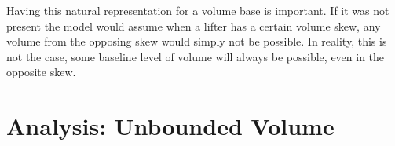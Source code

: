 Having this natural representation for a volume base is important. If it was not present the model would assume when a lifter has a certain volume skew, any volume from the opposing skew would simply not be possible. In reality, this is not the case, some baseline level of volume will always be possible, even in the opposite skew.


%

\section{Analysis: Unbounded Volume}
\label{sec:PotentialSurfaceUnboundedVolume}

